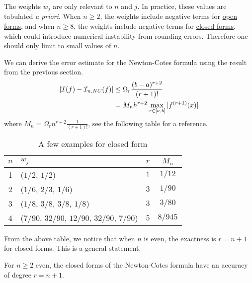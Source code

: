 The weights $w_j$ are only relevant to $n$ and $j$. In practice, these values are tabulated \emph{a priori}. When $n\ge 2$, the weights include negative terms for \underline{open forms}, and when $n\ge 8$, the weights include negative terms for \underline{closed forms}, which could introduce numerical instability from rounding errors. Therefore one should only limit to small values of $n$.
\begin{remark}
    We can derive the error estimate for the Newton-Cotes formula using the result from the previous section. 
    \begin{equation}
        \begin{aligned}
            |\mathcal I(f) - \mathcal I_{n,NC}(f)| &\le \Omega_r \frac{(b-a)^{r+2}}{(r+1)!}\\
&= M_n  h^{r+2} \max_{x\in[a, b]} |f^{(r+1)}(x)| 
    \end{aligned}
    \end{equation}
    where $M_n = \Omega_r n^{r+2}\frac{1}{(r+1)!}$, see the following table for a reference.
\end{remark}
\begin{table}[!htb]
    \caption{A few examples for closed form}
    \vspace{0.2cm}
    \centering
        \begin{tabular}{ c| l c  c}
            \hline 
            $n$ & $w_j$ & $r$ & $M_n$ \\ 
            \hline 
            \hline 
            1 & ($1/2$, $1/2$) & $1$ & $1/12$\\  
            2 &  ($1/6$, $2/3$, $1/6$)  & $3$ & $1/90$ \\
            3 & ($1/8$, $3/8$, $3/8$, $1/8$)& $3$ & $3/80$\\
            4 & ($7/90$, $32/90$, $12/90$, $32/90$, $7/90$) & $5$ & $8/945$\\
            \hline
           \end{tabular}
    \end{table}
    From the above table, we notice that when $n$ is even, the exactness is $r = n+1$ for closed forms. This is a general statement. 
\begin{lemma}
    For $n\ge 2$ even, the closed forms of the Newton-Cotes formula have an accuracy of degree $r = n+1$.
\end{lemma}

